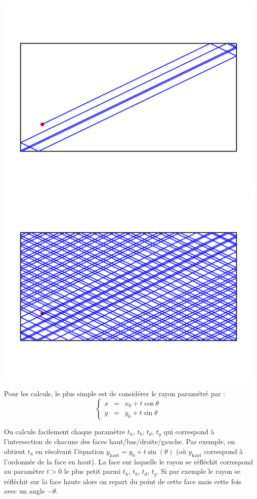 \documentclass[11pt,class=report,crop=false]{standalone}
\begin{document}
\begin{center}
	\includegraphics[scale=\myscale,scale=0.45,trim={0 1cm 0 1cm},clip]{figures/optique-3} \quad 
    \includegraphics[scale=\myscale,scale=0.45,trim={0 1cm 0 1cm},clip]{figures/optique-4}		
\end{center}

Pour les calculs, le plus simple est de considérer le rayon paramétré par :
$$\left\{ \begin{array}{rcl}
x &=& x_0 + t \cos \theta \\
y &=& y_0 + t \sin \theta 
\end{array} \right.$$

On calcule facilement chaque paramètre $t_h$, $t_b$, $t_d$, $t_g$ qui correspond à l'intersection de chacune des faces haut/bas/droite/gauche. Par exemple, on obtient $t_h$ en résolvant l'équation $y_{\text{haut}} = y_0 + t \sin(\theta)$ (où $y_{\text{haut}}$ correspond à l'ordonnée de la face en haut). 
La face sur laquelle le rayon se réfléchit correspond au paramètre $t>0$ le plus petit parmi $t_h$, $t_b$, $t_d$, $t_g$.
Si par exemple le rayon se réfléchit sur la face haute alors on repart du point de cette face mais cette fois avec un angle $-\theta$.
\end{document}
